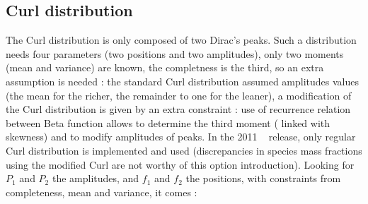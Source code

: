 \subsection*{Curl distribution}
 
The Curl distribution is only composed of two Dirac's peaks. Such a distribution
needs four parameters (two positions and two amplitudes), only two moments (mean
and variance) are known, the completness is the third, so an extra assumption is
needed : the standard Curl distribution assumed amplitudes values (the mean for
the richer, the remainder to one for the leaner), a modification of the Curl
distribution is given by an extra constraint : use of recurrence relation
between Beta function allows to determine the third moment ( linked with
skewness) and to modify amplitudes of peaks. In the 2011 \CS~ release, only
regular Curl distribution is implemented and used (discrepancies in species mass
fractions using the modified Curl are not worthy of this option introduction).
Looking for $P_1$ and $P_2$ the amplitudes, and $f_1$ and $f_2$ the positions,
with constraints from completeness, mean and variance, it comes :
 
